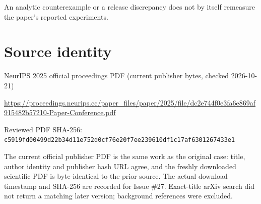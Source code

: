 \documentclass[11pt]{article}
\begin{document}
An analytic counterexample or a release discrepancy does not by itself remeasure the paper’s reported experiments.\par

\section*{Source identity}

NeurIPS 2025 official proceedings PDF (current publisher bytes, checked 2026-10-21)

\url{https://proceedings.neurips.cc/paper_files/paper/2025/file/dc2e744f0e3fa6e869af915482b57210-Paper-Conference.pdf}

Reviewed PDF SHA-256: \nolinkurl{c5919fd00499d22b34d11e752d0cf76e20f7ee239610df1c17af6301267433e1}

The current official publisher PDF is the same work as the original case: title, author identity and publisher hash URL agree, and the freshly downloaded scientific PDF is byte-identical to the prior source. The actual download timestamp and SHA-256 are recorded for Issue \#27. Exact-title arXiv search did not return a matching later version; background references were excluded.
\end{document}
